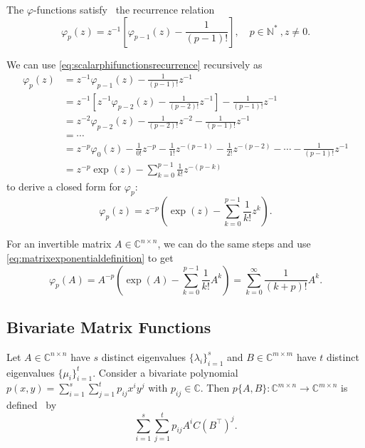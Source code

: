 The $\varphi$-functions satisfy~\cite{higham2008functions} the recurrence relation
\begin{equation}
    \label{eq:scalarphifunctionsrecurrence}
    \varphi_p(z) = z^{-1} \left[ \varphi_{p-1}(z) - \frac{1}{(p-1)!} \right] ,
    \quad p \in \mathbb{N^*} \:, z \neq 0 .
\end{equation}

We can use \eqref{eq:scalarphifunctionsrecurrence} recursively as
\begin{equation*}
    \begin{aligned}
        \varphi_p(z) & = z^{-1} \varphi_{p-1}(z) - \frac{1}{(p-1)!} z^{-1} \\
        & = z^{-1} \left[ z^{-1} \varphi_{p-2}(z) - \frac{1}{(p-2)!} z^{-1} \right] - \frac{1}{(p-1)!} z^{-1} \\
        & = z^{-2} \varphi_{p-2}(z) - \frac{1}{(p-2)!} z^{-2} - \frac{1}{(p-1)!} z^{-1} \\
        & = \cdots \\
        & = z^{-p} \varphi_{0}(z) - \frac{1}{0!} z^{-p} - \frac{1}{1!} z^{-(p-1)} - \frac{1}{2!} z^{-(p-2)} - \cdots - \frac{1}{(p-1)!} z^{-1} \\
        & = z^{-p} \exp(z) - \sum_{k=0}^{p-1}{\frac{1}{k!}z^{-(p-k)}}
        \end{aligned}
\end{equation*}
to derive a closed form for $\varphi_p$:
\begin{equation}
    \label{eq:scalarphifunctionsclosedform}
    \varphi_p(z) = z^{-p} \left( \exp(z) - \sum_{k=0}^{p-1}{\frac{1}{k!}z^{k}} \right).
\end{equation}

For an invertible matrix $A \in \mathbb{C}^{n \times n}$, we can do the same steps and use \eqref{eq:matrixexponentialdefinition}
to get
\begin{equation}
    \label{eq:matrixphifunctionsclosedform}
    \varphi_p(A) = A^{-p} \left( \exp(A) - \sum_{k=0}^{p-1}{\frac{1}{k!}A^{k}} \right) = \sum_{k=0}^{\infty}{\frac{1}{(k+p)!} A^{k}}.
\end{equation}

\subsection{Bivariate Matrix Functions}
Let $A \in \mathbb{C}^{n \times n}$ have $s$ distinct eigenvalues $\{\lambda_i\}_{i=1}^{s}$
and $B \in \mathbb{C}^{m \times m}$ have $t$ distinct eigenvalues $\{\mu_i\}_{i=1}^{t}$.
Consider a bivariate polynomial $p(x, y) = \sum_{i=1}^{s} \sum_{j=1}^{t} p_{ij} x^i y^j$
with $p_{ij} \in \mathbb{C}$. Then $p\{A, B\}: \mathbb{C}^{m \times n} \to \mathbb{C}^{m \times n}$
is defined~\cite{kressner2014bivariate} by
\begin{equation}
    \sum_{i=1}^{s} \sum_{j=1}^{t} p_{ij} A^i C (B^\top)^j.
\end{equation}

